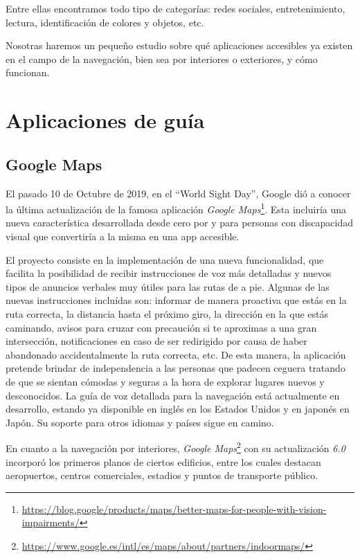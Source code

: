 Entre ellas encontramos todo tipo de categorías: redes sociales, entretenimiento, lectura, identificación de colores y objetos, etc. 

Nosotras haremos un pequeño estudio sobre qué aplicaciones accesibles ya existen en el campo de la navegación, bien sea por interiores o exteriores, y cómo funcionan.


\section{Aplicaciones de guía}
\subsection{Google Maps}
El pasado 10 de Octubre de 2019, en el ``World Sight Day'', Google dió a conocer la última actualización de la famosa aplicación \textit{Google Maps}\footnote{\url{https://blog.google/products/maps/better-maps-for-people-with-vision-impairments/}}. Esta incluiría una nueva característica desarrollada desde cero por y para personas con discapacidad visual que convertiría a la misma en una app accesible.

El proyecto consiste en la implementación de una nueva funcionalidad, que facilita la posibilidad de recibir instrucciones de voz más detalladas y nuevos tipos de anuncios verbales muy útiles para las rutas de a pie. Algunas de las nuevas instrucciones incluídas son: informar de manera proactiva que estás en la ruta correcta, la distancia hasta el próximo giro, la dirección en la que estás caminando, avisos para cruzar con precaución si te aproximas a una gran intersección, notificaciones en caso de ser redirigido por causa de haber abandonado accidentalmente la ruta correcta, etc. De esta manera, la aplicación pretende brindar de independencia a las personas que padecen ceguera tratando de que se sientan cómodas y seguras a la hora de explorar lugares nuevos y desconocidos. La guía de voz detallada para la navegación está actualmente en desarrollo, estando ya disponible en inglés en los Estados Unidos y en japonés en Japón. Su soporte para otros idiomas y países sigue en camino.

En cuanto a la navegación por interiores, \textit{Google Maps}\footnote{\url{https://www.google.es/intl/es/maps/about/partners/indoormaps/}} con su actualización \textit{6.0} incorporó los primeros planos de ciertos edificios, entre los cuales destacan aeropuertos, centros comerciales, estadios y puntos de transporte público.

